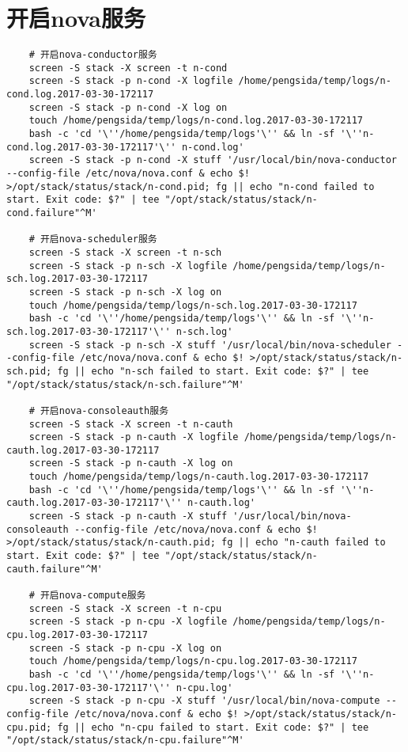 \documentclass[a4paper,left=1.5cm,right=1.5cm,11pt]{article}
\begin{document}
\section{开启nova服务}
	\begin{lstlisting}
	# 开启nova-conductor服务
	screen -S stack -X screen -t n-cond
	screen -S stack -p n-cond -X logfile /home/pengsida/temp/logs/n-cond.log.2017-03-30-172117
    screen -S stack -p n-cond -X log on
	touch /home/pengsida/temp/logs/n-cond.log.2017-03-30-172117
    bash -c 'cd '\''/home/pengsida/temp/logs'\'' && ln -sf '\''n-cond.log.2017-03-30-172117'\'' n-cond.log'
	screen -S stack -p n-cond -X stuff '/usr/local/bin/nova-conductor --config-file /etc/nova/nova.conf & echo $! >/opt/stack/status/stack/n-cond.pid; fg || echo "n-cond failed to start. Exit code: $?" | tee "/opt/stack/status/stack/n-cond.failure"^M'

	# 开启nova-scheduler服务
	screen -S stack -X screen -t n-sch
	screen -S stack -p n-sch -X logfile /home/pengsida/temp/logs/n-sch.log.2017-03-30-172117
    screen -S stack -p n-sch -X log on
	touch /home/pengsida/temp/logs/n-sch.log.2017-03-30-172117
    bash -c 'cd '\''/home/pengsida/temp/logs'\'' && ln -sf '\''n-sch.log.2017-03-30-172117'\'' n-sch.log'
	screen -S stack -p n-sch -X stuff '/usr/local/bin/nova-scheduler --config-file /etc/nova/nova.conf & echo $! >/opt/stack/status/stack/n-sch.pid; fg || echo "n-sch failed to start. Exit code: $?" | tee "/opt/stack/status/stack/n-sch.failure"^M'

	# 开启nova-consoleauth服务
	screen -S stack -X screen -t n-cauth
	screen -S stack -p n-cauth -X logfile /home/pengsida/temp/logs/n-cauth.log.2017-03-30-172117
    screen -S stack -p n-cauth -X log on
	touch /home/pengsida/temp/logs/n-cauth.log.2017-03-30-172117
    bash -c 'cd '\''/home/pengsida/temp/logs'\'' && ln -sf '\''n-cauth.log.2017-03-30-172117'\'' n-cauth.log'
	screen -S stack -p n-cauth -X stuff '/usr/local/bin/nova-consoleauth --config-file /etc/nova/nova.conf & echo $! >/opt/stack/status/stack/n-cauth.pid; fg || echo "n-cauth failed to start. Exit code: $?" | tee "/opt/stack/status/stack/n-cauth.failure"^M'

	# 开启nova-compute服务
	screen -S stack -X screen -t n-cpu
	screen -S stack -p n-cpu -X logfile /home/pengsida/temp/logs/n-cpu.log.2017-03-30-172117
    screen -S stack -p n-cpu -X log on
	touch /home/pengsida/temp/logs/n-cpu.log.2017-03-30-172117
    bash -c 'cd '\''/home/pengsida/temp/logs'\'' && ln -sf '\''n-cpu.log.2017-03-30-172117'\'' n-cpu.log'
	screen -S stack -p n-cpu -X stuff '/usr/local/bin/nova-compute --config-file /etc/nova/nova.conf & echo $! >/opt/stack/status/stack/n-cpu.pid; fg || echo "n-cpu failed to start. Exit code: $?" | tee "/opt/stack/status/stack/n-cpu.failure"^M'
	\end{lstlisting}
\end{document}
